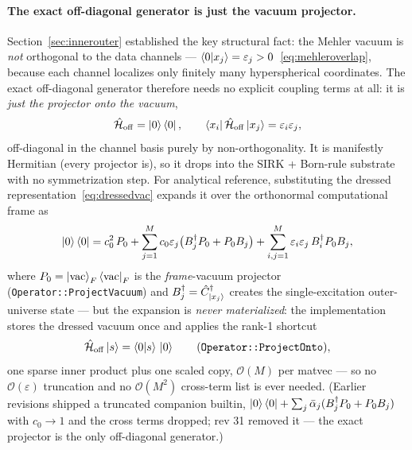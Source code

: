 \documentclass[11pt, a4paper]{article}
\newcommand{\Hgen}{\hat{\mathcal{H}}}
\begin{document}
\paragraph{The exact off-diagonal generator is just the vacuum projector.}
Section~\ref{sec:innerouter} established the key structural fact: the
Mehler vacuum is \emph{not} orthogonal to the data channels ---
$\braket{0|x_j}=\varepsilon_j>0$~\eqref{eq:mehleroverlap}, because each
channel localizes only finitely many hyperspherical coordinates. The exact
off-diagonal generator therefore needs no explicit coupling terms at all:
it is \emph{just the projector onto the vacuum},
\begin{equation}
  \Hgen_{\mathrm{off}}=\ket{0}\bra{0},\qquad
  \bra{x_i}\Hgen_{\mathrm{off}}\ket{x_j}
  =\varepsilon_i\varepsilon_j ,
  \label{eq:Hmehler}
\end{equation}
off-diagonal in the channel basis purely by non-orthogonality. It is
manifestly Hermitian (every projector is), so it drops into the SIRK +
Born-rule substrate with no symmetrization step. For analytical reference,
substituting the dressed representation~\eqref{eq:dressedvac} expands it
over the orthonormal computational frame as
\begin{equation}
  \ket{0}\bra{0}
  =c_0^2\,P_0
  +\sum_{j=1}^M c_0\varepsilon_j\bigl(B_j^\dagger P_0+P_0B_j\bigr)
  +\sum_{i,j=1}^M \varepsilon_i\varepsilon_j\,B_i^\dagger P_0 B_j ,
  \label{eq:Hmehlerexp}
\end{equation}
where $P_0=\ket{\mathrm{vac}}_F\bra{\mathrm{vac}}_F$ is the \emph{frame}-vacuum
projector (\texttt{Operator::ProjectVacuum}) and
$B_j^\dagger=\hat C^\dagger_{\ket{x_j}}$ creates the single-excitation
outer-universe state --- but the expansion is \emph{never materialized}:
the implementation stores the dressed vacuum once and applies the rank-1
shortcut
\begin{equation}
  \Hgen_{\mathrm{off}}\ket{s}=\braket{0|s}\,\ket{0}
  \qquad(\texttt{Operator::ProjectOnto}),
  \label{eq:rank1shortcut}
\end{equation}
one sparse inner product plus one scaled copy, $\mathcal{O}(M)$ per matvec
--- so no $\mathcal{O}(\varepsilon)$ truncation and no
$\mathcal{O}(M^2)$ cross-term list is ever needed. (Earlier revisions
shipped a truncated companion builtin, $\ket{0}\bra{0}+\sum_j\bar\alpha_j
(B_j^\dagger P_0+P_0B_j)$ with $c_0\to1$ and the cross terms dropped; rev
31 removed it --- the exact projector is the only off-diagonal generator.)
\end{document}
